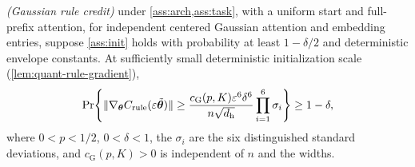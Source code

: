 \item \emph{(Gaussian rule credit)} under \cref{ass:arch,ass:task}, with a uniform start
and full-prefix attention, for independent centered Gaussian
attention and embedding entries, suppose \cref{ass:init} holds with probability
at least $1-\delta/2$ and deterministic envelope constants. At sufficiently
small deterministic initialization scale (\cref{lem:quant-rule-gradient}),
\[
 \Pr\!\left\{\|\nabla_{\bm\theta}C_{\mathrm{rule}}(\varepsilon\tilde{\bm\theta})\|
 \ge\frac{c_{\mathrm G}(p,K)\varepsilon^6\delta^6}{n\sqrt{d_{\mathrm h}}}
 \prod_{i=1}^6\sigma_i\right\}\ge1-\delta,
\]
where $0<p<1/2$, $0<\delta<1$, the $\sigma_i$ are the six distinguished
standard deviations, and $c_{\mathrm G}(p,K)>0$ is independent of $n$ and the widths.
